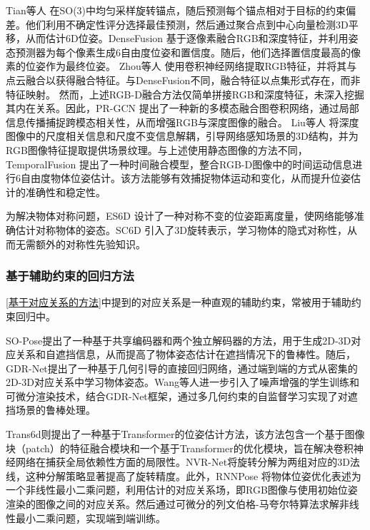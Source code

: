\par Tian等人\cite{tian2020robust} 在SO(3)中均匀采样旋转锚点，随后预测每个锚点相对于目标的约束偏差。他们利用不确定性评分选择最佳预测，然后通过聚合点到中心向量检测3D平移，从而估计6D位姿。DenseFusion\cite{wang2019densefusion} 基于逐像素融合RGB和深度特征，并利用姿态预测器为每个像素生成6自由度位姿和置信度。随后，他们选择置信度最高的像素的位姿作为最终位姿。
Zhou等人\cite{zhou2020novel} 使用卷积神经网络提取RGB特征，并将其与点云融合以获得融合特征。与DenseFusion\cite{wang2019densefusion}不同，融合特征以点集形式存在，而非特征映射。
然而，上述RGB-D融合方法仅简单拼接RGB和深度特征，未深入挖掘其内在关系。因此，PR-GCN\cite{Zhou2021PRGCNAD} 提出了一种新的多模态融合图卷积网络，通过局部信息传播捕捉跨模态相关性，从而增强RGB与深度图像的融合。
Liu等人\cite{liu2023depth} 将深度图像中的尺度相关信息和尺度不变信息解耦，引导网络感知场景的3D结构，并为RGB图像特征提取提供场景纹理。与上述使用静态图像的方法不同，TemporalFusion\cite{mu2021temporalfusion} 提出了一种时间融合模型，整合RGB-D图像中的时间运动信息进行6自由度物体位姿估计。该方法能够有效捕捉物体运动和变化，从而提升位姿估计的准确性和稳定性。

\par 为解决物体对称问题，ES6D\cite{mo2022es6d} 设计了一种对称不变的位姿距离度量，使网络能够准确估计对称物体的姿态。SC6D\cite{cai2022sc6d} 引入了3D旋转表示，学习物体的隐式对称性，从而无需额外的对称性先验知识。

\subsubsection{基于辅助约束的回归方法}\label{基于辅助约束的回归方法}

\par \autoref{基于对应关系的方法}中提到的对应关系是一种直观的辅助约束，常被用于辅助约束回归中。

\par SO-Pose\cite{Di_2021_ICCV}提出了一种基于共享编码器和两个独立解码器的方法，用于生成2D-3D对应关系和自遮挡信息，从而提高了物体姿态估计在遮挡情况下的鲁棒性。随后，GDR-Net\cite{wang2021gdr}提出了一种基于几何引导的直接回归网络，通过端到端的方式从密集的2D-3D对应关系中学习物体姿态。Wang等人\cite{wang2021occlusion}进一步引入了噪声增强的学生训练和可微分渲染技术，结合GDR-Net框架\cite{wang2021gdr}，通过多几何约束的自监督学习实现了对遮挡场景的鲁棒处理。

\par Trans6d\cite{zhang2022trans6d}则提出了一种基于Transformer的位姿估计方法，该方法包含一个基于图像块（patch）的特征融合模块和一个基于Transformer的优化模块，旨在解决卷积神经网络在捕获全局依赖性方面的局限性。NVR-Net\cite{feng2023nvr}将旋转分解为两组对应的3D法线，这种分解策略显著提高了旋转精度。此外，RNNPose\cite{Xu2024RNNPose} 将物体位姿优化表述为一个非线性最小二乘问题，利用估计的对应关系场，即RGB图像与使用初始位姿渲染的图像之间的对应关系。然后通过可微分的列文伯格-马夸尔特算法\cite{Levenberg_Marquardt}求解非线性最小二乘问题，实现端到端训练。

